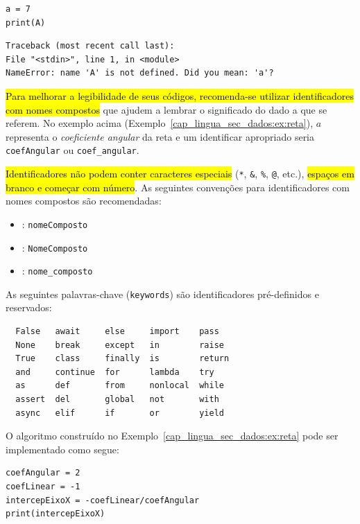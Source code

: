 \begin{lstlisting}
a = 7
print(A)
\end{lstlisting}

\begin{verbatim}
Traceback (most recent call last):
File "<stdin>", line 1, in <module>
NameError: name 'A' is not defined. Did you mean: 'a'?
\end{verbatim}

\hl{Para melhorar a legibilidade de seus códigos, recomenda-se utilizar identificadores com nomes compostos} que ajudem a lembrar o significado do dado a que se referem. No exemplo acima (Exemplo~\ref{cap_lingua_sec_dados:ex:reta}), $a$ representa o \emph{coeficiente angular} da reta e um identificar apropriado seria \texttt{coefAngular} ou \texttt{coef\_angular}.

\hl{Identificadores não podem conter caracteres especiais} (\lstinline+*+, \lstinline+&+, \lstinline+%+,
\lstinline+@+, etc.), \hl{espaços em branco e começar com número}. As seguintes convenções para identificadores com nomes compostos são recomendadas:
\begin{itemize}
\item {}: \texttt{nomeComposto}
\item {}: \texttt{NomeComposto}
\item {}: \texttt{nome\_composto}
\end{itemize}

\begin{obs}
  As seguintes palavras-chave (\texttt{keywords}) são identificadores pré-definidos e reservados:

\begin{verbatim}
  False   await     else     import    pass
  None    break     except   in        raise
  True    class     finally  is        return
  and     continue  for      lambda    try
  as      def       from     nonlocal  while
  assert  del       global   not       with
  async   elif      if       or        yield
\end{verbatim}

\end{obs}

\begin{ex}
  O algoritmo construído no Exemplo~\ref{cap_lingua_sec_dados:ex:reta} pode ser implementado como segue:

\begin{lstlisting}
coefAngular = 2
coefLinear = -1
intercepEixoX = -coefLinear/coefAngular
print(intercepEixoX)
\end{lstlisting}

\end{ex}

